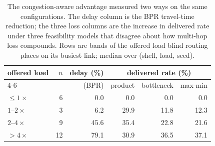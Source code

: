 \begin{table}[t]
\centering\scriptsize\setlength{\tabcolsep}{3.4pt}
\caption{The congestion-aware advantage measured two ways on the same configurations. The delay column is the BPR travel-time reduction; the three loss columns are the increase in delivered rate under three feasibility models that disagree about how multi-hop loss compounds. Rows are bands of the offered load blind routing places on its busiest link; median over (shell, load, seed).}
\label{tab:feasibility}
\begin{tabular}{@{}lrrrrr@{}}
\toprule
offered load & $n$ & delay (\%) & \multicolumn{3}{c}{delivered rate (\%)} \\
\cmidrule(l){4-6}
 & & (BPR) & product & bottleneck & max-min \\
\midrule
$\le 1\times$ & 6 & 0.0 & 0.0 & 0.0 & 0.0 \\
$1$--$2\times$ & 3 & 6.2 & 29.9 & 11.8 & 12.3 \\
$2$--$4\times$ & 9 & 45.6 & 35.4 & 22.8 & 21.6 \\
$>4\times$ & 12 & 79.1 & 30.9 & 36.5 & 37.1 \\
\bottomrule
\end{tabular}
\end{table}
